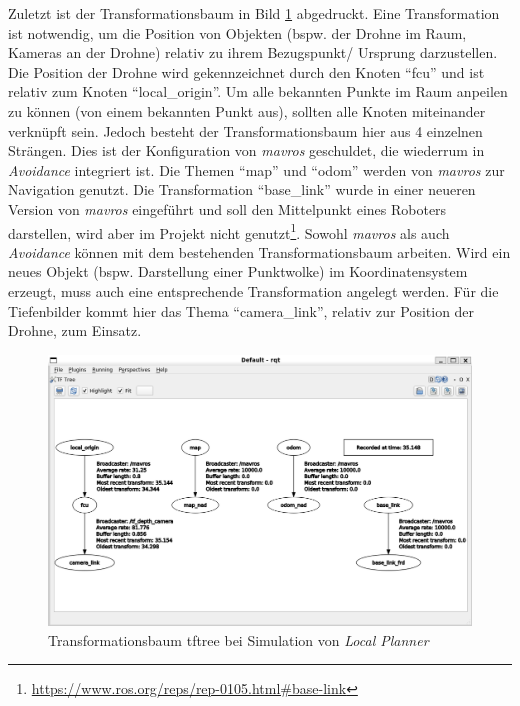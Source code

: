 Zuletzt ist der Transformationsbaum in Bild \ref{fig:sim_gazebo_tftree} abgedruckt. Eine Transformation ist notwendig, um die Position von Objekten (bspw. der Drohne im Raum, Kameras an der Drohne) relativ zu ihrem Bezugspunkt/ Ursprung darzustellen. Die Position der Drohne wird gekennzeichnet durch den Knoten \enquote{fcu} und ist relativ zum Knoten \enquote{local\_origin}. Um alle bekannten Punkte im Raum anpeilen zu können (von einem bekannten Punkt aus), sollten alle Knoten miteinander verknüpft sein. Jedoch besteht der Transformationsbaum hier aus 4 einzelnen Strängen. Dies ist der Konfiguration von \textit{mavros} geschuldet, die wiederrum in \textit{Avoidance} integriert ist. Die Themen \enquote{map} und \enquote{odom} werden von \textit{mavros} zur Navigation genutzt. Die Transformation \enquote{base\_link} wurde in einer neueren Version von \textit{mavros} eingeführt und soll den Mittelpunkt eines Roboters darstellen, wird aber im Projekt nicht genutzt\footnote{\url{https://www.ros.org/reps/rep-0105.html\#base-link}}. Sowohl \textit{mavros} als auch \textit{Avoidance} können mit dem bestehenden Transformationsbaum arbeiten. Wird ein neues Objekt (bspw. Darstellung einer Punktwolke) im Koordinatensystem 
erzeugt, muss auch eine entsprechende Transformation angelegt werden. Für die Tiefenbilder kommt hier das Thema \enquote{camera\_link}, relativ zur Position der Drohne, zum Einsatz.
\begin{figure}[!ht]
    \centering
    \includegraphics[width=\linewidth]{images/sim_gazebo_tftree.png}
    \caption{Transformationsbaum tftree bei Simulation von \textit{Local Planner}}
    \label{fig:sim_gazebo_tftree}
\end{figure}

